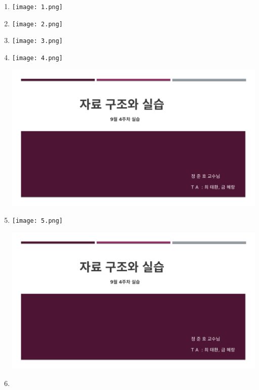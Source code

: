 \documentclass[11pt,a4paper]{article}
\begin{document}
\begin{enumerate}
	\vspace{1cm}\Huge\item

	
\texttt{[image: 1.png]}	

\vspace{1cm}\Huge\item

	
\texttt{[image: 2.png]}	


\vspace{1cm}\Huge\item

	
\texttt{[image: 3.png]}	


\vspace{1cm}\Huge\item

	
\texttt{[image: 4.png]}	


\includegraphics[page=3, width=\textwidth]{1.pdf}
\vspace{1cm}\Huge\item

	
\texttt{[image: 5.png]}	


\includegraphics[page=4, width=\textwidth]{1.pdf}
\vspace{1cm}\Huge\item


\end{enumerate}
\end{document}
